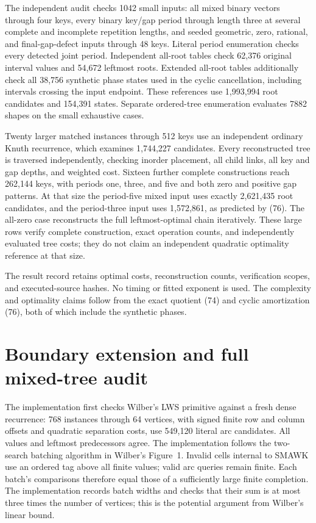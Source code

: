 \documentclass[11pt]{article}
\begin{document}
The independent audit checks 1042 small inputs: all mixed binary vectors
through four keys, every binary key/gap period through length three at
several complete and incomplete repetition lengths, and seeded geometric,
zero, rational, and final-gap-defect inputs through 48 keys. Literal period
enumeration checks every detected joint period. Independent all-root tables
check 62,376 original interval values and 54,672 leftmost roots. Extended
all-root tables additionally check all 38,756 synthetic phase states used
in the cyclic cancellation, including intervals crossing the input endpoint.
These references use 1,993,994 root candidates and 154,391 states. Separate
ordered-tree enumeration evaluates 7882 shapes on the small exhaustive cases.

Twenty larger matched instances through 512 keys use an independent ordinary
Knuth recurrence, which examines 1,744,227 candidates. Every reconstructed
tree is traversed independently, checking inorder placement, all child links,
all key and gap depths, and weighted cost. Sixteen further complete
constructions reach 262,144 keys, with periods one, three, and five and both
zero and positive gap patterns. At that size the period-five mixed input uses
exactly 2,621,435 root candidates, and the period-three input uses 1,572,861,
as predicted by (76). The all-zero case reconstructs
the full leftmost-optimal chain iteratively. These large rows verify complete
construction, exact operation counts, and independently evaluated tree costs;
they do not claim an independent quadratic optimality reference at that size.

The result record retains optimal costs, reconstruction counts,
verification scopes, and executed-source hashes. No timing or fitted exponent
is used. The complexity and optimality claims follow from the exact quotient
(74) and cyclic amortization
(76), both of which include the synthetic phases.

\clearpage
\section{Boundary extension and full mixed-tree audit}
\label{app:fringe-obst}

The implementation first checks Wilber's LWS primitive against a fresh dense
recurrence: 768 instances through 64 vertices, with signed finite row and
column offsets and quadratic separation costs, use 549,120 literal arc
candidates. All values and leftmost predecessors agree. The implementation
follows the two-search batching algorithm in Wilber's Figure~1. Invalid
cells internal to SMAWK use an ordered tag above all finite values; valid
arc queries remain finite. Each batch's comparisons therefore equal those
of a sufficiently large finite completion. The implementation records
batch widths and checks that their sum is at most three times the number
of vertices; this is the potential argument from Wilber's linear bound.
\end{document}
